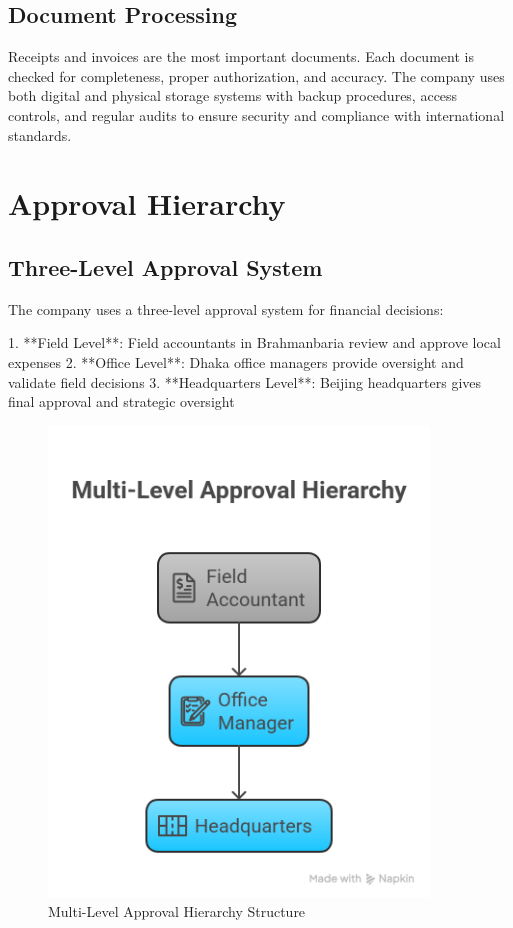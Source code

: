 \subsection{Document Processing}
Receipts and invoices are the most important documents. Each document is checked for completeness, proper authorization, and accuracy. The company uses both digital and physical storage systems with backup procedures, access controls, and regular audits to ensure security and compliance with international standards.

\vspace{0.5em}
\section{Approval Hierarchy}

\subsection{Three-Level Approval System}
The company uses a three-level approval system for financial decisions:

1. **Field Level**: Field accountants in Brahmanbaria review and approve local expenses
2. **Office Level**: Dhaka office managers provide oversight and validate field decisions  
3. **Headquarters Level**: Beijing headquarters gives final approval and strategic oversight

\begin{figure}[H]
    \centering
    \includegraphics[width=0.9\textwidth]{assets/images/approval_hierarchy.png}
    \caption{Multi-Level Approval Hierarchy Structure}
    \label{fig:approval_hierarchy}
\end{figure}

